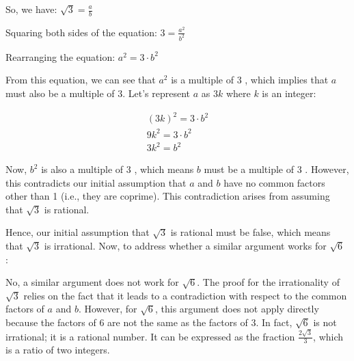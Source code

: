\documentclass{report}
\begin{document}
So, we have: $\sqrt{3}=\frac{a}{b}$

Squaring both sides of the equation: $3=\frac{a^{2}}{b^{2}}$

Rearranging the equation: $a^{2}=3 \cdot b^{2}$

From this equation, we can see that $a^{2}$ is a multiple of 3 , which implies that $a$ must also be a multiple of 3. Let's represent $a$ as $3 k$ where $k$ is an integer:

$$
\begin{gathered}
(3 k)^{2}=3 \cdot b^{2} \\
9 k^{2}=3 \cdot b^{2} \\
3 k^{2}=b^{2}
\end{gathered}
$$

Now, $b^{2}$ is also a multiple of 3 , which means $b$ must be a multiple of 3 . However, this contradicts our initial assumption that $a$ and $b$ have no common factors other than 1 (i.e., they are coprime). This contradiction arises from assuming that $\sqrt{3}$ is rational.

Hence, our initial assumption that $\sqrt{3}$ is rational must be false, which means that $\sqrt{3}$ is irrational. Now, to address whether a similar argument works for $\sqrt{6}$ :

No, a similar argument does not work for $\sqrt{6}$. The proof for the irrationality of $\sqrt{3}$ relies on the fact that it leads to a contradiction with respect to the common factors of $a$ and $b$. However, for $\sqrt{6}$, this argument does not apply directly because the factors of 6 are not the same as the factors of 3. In fact, $\sqrt{6}$ is not irrational; it is a rational number. It can be expressed as the fraction $\frac{2 \sqrt{3}}{3}$, which is a ratio of two integers.
\end{document}
